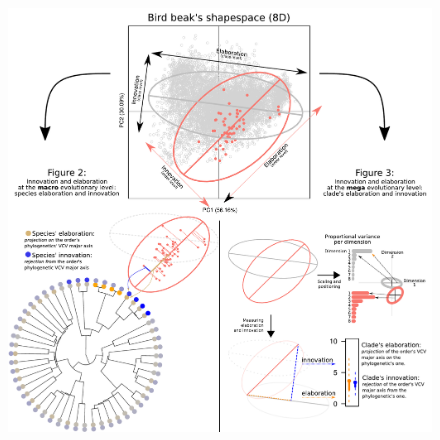 \documentclass[12pt,letterpaper]{article}
\providecommand{\DIFaddtex}[1]{{\protect\color{blue}\uwave{#1}}} %
\providecommand{\DIFaddbegin}{} %
\providecommand{\DIFaddFL}[1]{\DIFadd{#1}} %
\providecommand{\DIFadd}[1]{\texorpdfstring{\DIFaddtex{#1}}{#1}} %
\newcommand{\DIFaddincludegraphics}[2][]{{\color{blue}\fbox{\DIFOincludegraphics[#1]{#2}}}} %
\DeclareRobustCommand{\DIFaddbegin}{\DIFOaddbegin \let\includegraphics\DIFaddincludegraphics} %
\begin{document}
\DIFaddbegin \begin{figure}[!htbp]
\centering
   \includegraphics[width=1\textwidth]{Figures/cheat_sheet.pdf}
\caption{\DIFaddFL{.}}
\label{Fig:cheatsheet}
\end{figure}
\bigskip
\end{document}
